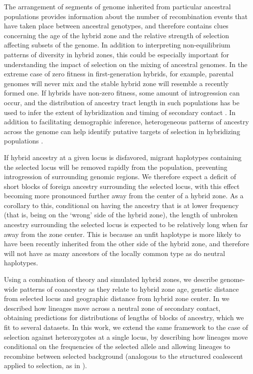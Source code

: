 \documentclass[11pt,letterpaper]{article}
\begin{document}
The arrangement of segments of genome inherited from particular ancestral populations
provides information about the number of recombination events that have taken place between ancestral genotypes, 
and therefore contains clues concerning the age of the hybrid zone and the relative strength of selection affecting subsets of the genome. %
In addition to interpreting non-equilibrium patterns of diversity in hybrid zones, 
this could be especially important for understanding the impact of selection on the mixing of ancestral genomes. %
In the extreme case of zero fitness in first-generation hybrids, for example, parental genomes will never mix and the stable hybrid zone will resemble a recently formed one. 
If hybrids have non-zero fitness, some amount of introgression can occur, and the distribution of ancestry tract length in such populations has be used to infer the extent of hybridization and timing of secondary contact \citep{Price2009, Hellenthal2014}. 
In addition to facilitating demographic inference, heterogeneous patterns of ancestry across the genome can help identify putative targets of selection in hybridizing populations  \citep{Porter1997, Gompert2012}. 

If hybrid ancestry at a given locus is disfavored, migrant haplotypes containing the selected locus will be removed rapidly from the population, preventing introgression of surrounding genomic regions. We therefore expect a deficit of short blocks of foreign ancestry surrounding the selected locus, with this effect becoming more pronounced further away from the center of a hybrid zone. As a corollary to this, conditional on having the ancestry that is at lower frequency (that is, being on the `wrong' side of the hybrid zone), the length of unbroken ancestry surrounding the selected locus is expected to be relatively long when far away from the zone center.  This is because an unfit haplotype is more likely to have been recently inherited from the other side of the hybrid zone, and therefore will not have
as many ancestors of the locally common type as do neutral haplotypes.

Using a combination of theory and simulated hybrid zones, we describe genome-wide patterns of coancestry 
as they relate to hybrid zone age, genetic distance from selected locus and geographic distance from hybrid zone center. 
In \citet{sedghifar2015spatial} we described how lineages move across a neutral zone of secondary contact,
obtaining predictions for distributions of lengths of blocks of ancestry, which we fit to several datasets.
In this work, we extend the same framework to the case of selection against heterozygotes at a single locus,
by describing how lineages move conditional on the frequencies of the selected allele
and allowing lineages to recombine between selected background 
(analogous to the structured coalescent applied to selection, as in \citet{hudson1988coalescent}).
\end{document}
